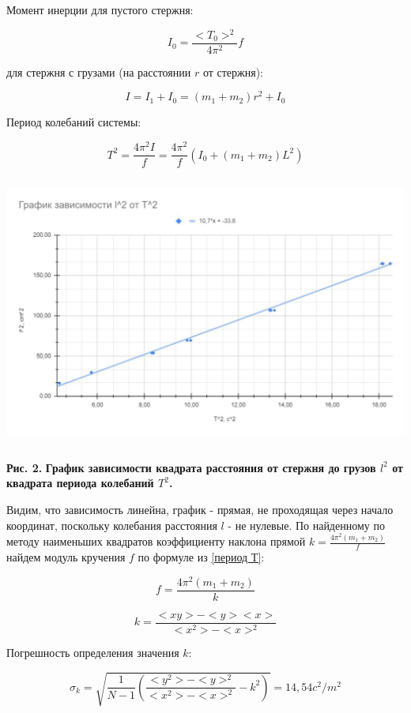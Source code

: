     Момент инерции для пустого стержня:
    
\[I_0 = \frac{<T_0>^2}{4\pi^2}f\]

    для стержня с грузами (на расстоянии $r$ от стержня):
    
\[I = I_1 + I_0 = (m_1 + m_2)r^2 + I_0\]

    Период колебаний системы:
    
\[T^2 = \frac{4\pi^2I}{f} = \frac{4\pi^2}{f} (I_0 + (m_1 + m_2)L^2)\]
    
\newpage
\begin{center}
\includegraphics[width=14cm, height=9cm]{tl.jpeg}
\end{center}
\begin{flushright}
{\scriptsize \textbf{Рис. 2.} \textbf {График зависимости квадрата расстояния от стержня до грузов $l^2$ от квадрата периода колебаний $T^2$.}}
\end{flushright}
    
    Видим, что зависимость линейна, график - прямая, не проходящая через начало координат, поскольку колебания расстояния $l$ - не нулевые. По найденному по методу наименьших квадратов коэффициенту наклона прямой $k = \frac{4\pi^2 (m_1 + m_2)}{f}$ найдем модуль кручения $f$ по формуле из \eqref{период Т}:
    
\[f = \frac{4\pi^2(m_1 + m_2)}{k}\]

\[k = \frac{<xy> - <y><x>}{<x^2> - <x>^2}\]    
    
    Погрешность определения значения $k$:
    
\[\sigma_{k} = \sqrt{\frac{1}{N-1} \left(\frac{<y^2> - <y>^2}{<x^2> - <x>^2} - k^2\right)} = 14,54 c^2/m^2\]

